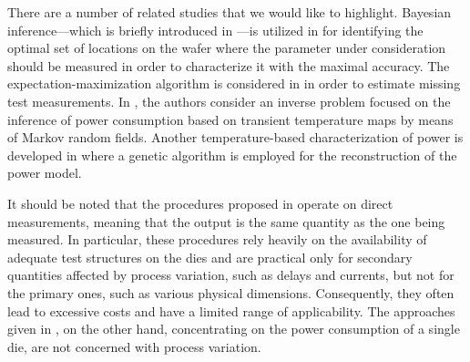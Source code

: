 There are a number of related studies that we would like to highlight. Bayesian
inference---which is briefly introduced in ---is
utilized in \cite{zhang2010} for identifying the optimal set of locations on the
wafer where the parameter under consideration should be measured in order to
characterize it with the maximal accuracy. The expectation-maximization
algorithm is considered in \cite{reda2009} in order to estimate missing test
measurements. In \cite{paek2012}, the authors consider an inverse problem
focused on the inference of power consumption based on transient temperature
maps by means of Markov random fields. Another temperature-based
characterization of power is developed in \cite{mesa-martinez2007} where a
genetic algorithm is employed for the reconstruction of the power model.

It should be noted that the procedures proposed in \cite{reda2009, zhang2010}
operate on direct measurements, meaning that the output is the same quantity as
the one being measured. In particular, these procedures rely heavily on the
availability of adequate test structures on the dies and are practical only for
secondary quantities affected by process variation, such as delays and currents,
but not for the primary ones, such as various physical dimensions. Consequently,
they often lead to excessive costs and have a limited range of applicability.
The approaches given in \cite{mesa-martinez2007, paek2012}, on the other hand,
concentrating on the power consumption of a single die, are not concerned with
process variation.
